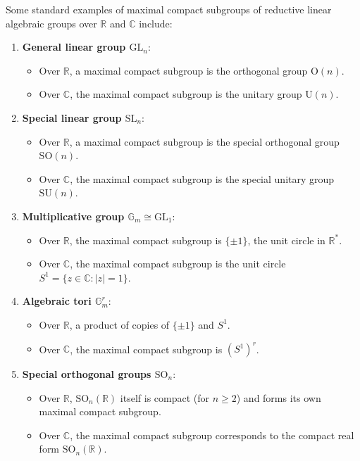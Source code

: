 \begin{example}
Some standard examples of maximal compact subgroups of reductive linear algebraic groups over \(\mathbb{R}\) and \(\mathbb{C}\) include:

\begin{enumerate}
    \item \textbf{General linear group \(\mathrm{GL}_n\)}:
    \begin{itemize}
        \item Over \(\mathbb{R}\), a maximal compact subgroup is the orthogonal group \(\mathrm{O}(n)\).
        \item Over \(\mathbb{C}\), the maximal compact subgroup is the unitary group \(\mathrm{U}(n)\).
    \end{itemize}

    \item \textbf{Special linear group \(\mathrm{SL}_n\)}:
    \begin{itemize}
        \item Over \(\mathbb{R}\), a maximal compact subgroup is the special orthogonal group \(\mathrm{SO}(n)\).
        \item Over \(\mathbb{C}\), the maximal compact subgroup is the special unitary group \(\mathrm{SU}(n)\).
    \end{itemize}

    \item \textbf{Multiplicative group \(\mathbb{G}_m \cong \mathrm{GL}_1\)}:
    \begin{itemize}
        \item Over \(\mathbb{R}\), the maximal compact subgroup is \(\{\pm 1\}\), the unit circle in \(\mathbb{R}^*\).
        \item Over \(\mathbb{C}\), the maximal compact subgroup is the unit circle \(S^1 = \{ z \in \mathbb{C} : |z| = 1 \}\).
    \end{itemize}

    \item \textbf{Algebraic tori \(\mathbb{G}_m^r\)}:
    \begin{itemize}
        \item Over \(\mathbb{R}\), a product of copies of \(\{\pm 1\}\) and \(S^1\).
        \item Over \(\mathbb{C}\), the maximal compact subgroup is \((S^1)^r\).
    \end{itemize}

    \item \textbf{Special orthogonal groups \(\mathrm{SO}_n\)}:
    \begin{itemize}
        \item Over \(\mathbb{R}\), \(\mathrm{SO}_n(\mathbb{R})\) itself is compact (for \(n \geq 2\)) and forms its own maximal compact subgroup.
        \item Over \(\mathbb{C}\), the maximal compact subgroup corresponds to the compact real form \(\mathrm{SO}_n(\mathbb{R})\).
    \end{itemize}


\end{enumerate}
\end{example}
